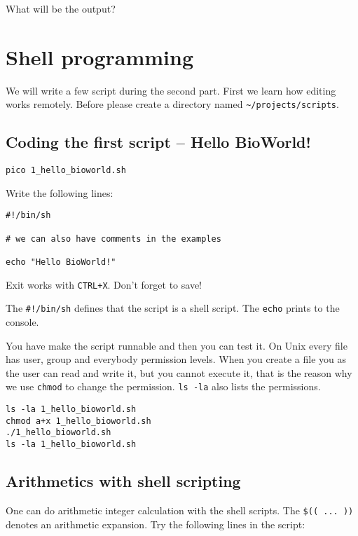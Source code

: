 \documentclass{article}\usepackage[]{graphicx}\usepackage[usenames,dvipsnames]{color}
\begin{document}
What will be the output?

\section{Shell programming}

We will write a few script during the second part. First we learn how editing works remotely. Before please create a directory named \verb+~/projects/scripts+.

\subsection*{Coding the first script -- Hello BioWorld!}

\begin{verbatim}
pico 1_hello_bioworld.sh
\end{verbatim}

Write the following lines:

\begin{verbatim}
#!/bin/sh

# we can also have comments in the examples

echo "Hello BioWorld!"
\end{verbatim}

Exit works with \verb!CTRL+X!. Don't forget to save!

The \verb+#!/bin/sh+ defines that the script is a shell script. The \verb+echo+ prints to the console.

You have make the script runnable and then you can test it. On Unix every file has user, group and everybody permission levels. When you create a file you as the user can read and write it, but you cannot execute it, that is the reason why we use \verb+chmod+ to change the permission. \verb+ls -la+ also lists the permissions.

\begin{verbatim}
ls -la 1_hello_bioworld.sh
chmod a+x 1_hello_bioworld.sh
./1_hello_bioworld.sh
ls -la 1_hello_bioworld.sh
\end{verbatim}

\subsection*{Arithmetics with shell scripting}

One can do arithmetic integer calculation with the shell scripts. The \verb+$(( ... ))+ denotes an arithmetic expansion. Try the following lines in the \verb++ script:
\end{document}
